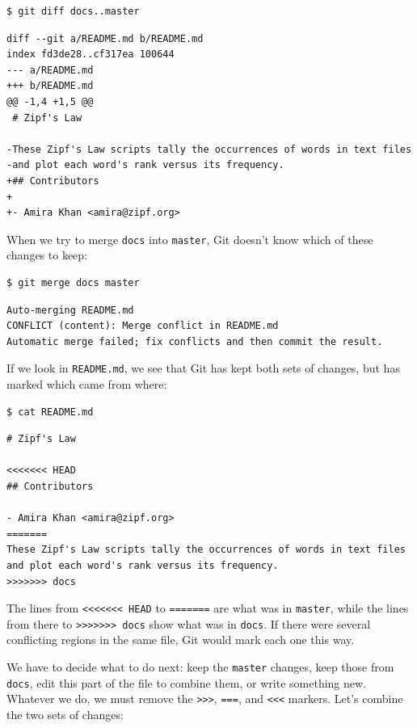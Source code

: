 \documentclass[
]{krantz}
\begin{document}
\begin{verbatim}
$ git diff docs..master
\end{verbatim}

\begin{verbatim}
diff --git a/README.md b/README.md
index fd3de28..cf317ea 100644
--- a/README.md
+++ b/README.md
@@ -1,4 +1,5 @@
 # Zipf's Law

-These Zipf's Law scripts tally the occurrences of words in text files
-and plot each word's rank versus its frequency.
+## Contributors
+
+- Amira Khan <amira@zipf.org>
\end{verbatim}

When we try to merge \texttt{docs} into \texttt{master},
Git doesn't know which of these changes to keep:

\begin{verbatim}
$ git merge docs master
\end{verbatim}

\begin{verbatim}
Auto-merging README.md
CONFLICT (content): Merge conflict in README.md
Automatic merge failed; fix conflicts and then commit the result.
\end{verbatim}

If we look in \texttt{README.md},
we see that Git has kept both sets of changes,
but has marked which came from where:

\begin{verbatim}
$ cat README.md
\end{verbatim}

\begin{verbatim}
# Zipf's Law

<<<<<<< HEAD
## Contributors

- Amira Khan <amira@zipf.org>
=======
These Zipf's Law scripts tally the occurrences of words in text files
and plot each word's rank versus its frequency.
>>>>>>> docs
\end{verbatim}

The lines from \texttt{\textless{}\textless{}\textless{}\textless{}\textless{}\textless{}\textless{}~HEAD} to \texttt{=======} are what was in \texttt{master},
while the lines from there to \texttt{\textgreater{}\textgreater{}\textgreater{}\textgreater{}\textgreater{}\textgreater{}\textgreater{}~docs} show what was in \texttt{docs}.
If there were several conflicting regions in the same file,
Git would mark each one this way.

We have to decide what to do next:
keep the \texttt{master} changes,
keep those from \texttt{docs},
edit this part of the file to combine them,
or write something new.
Whatever we do,
we must remove the \texttt{\textgreater{}\textgreater{}\textgreater{}}, \texttt{===}, and \texttt{\textless{}\textless{}\textless{}} markers.
Let's combine the two sets of changes:
\end{document}
